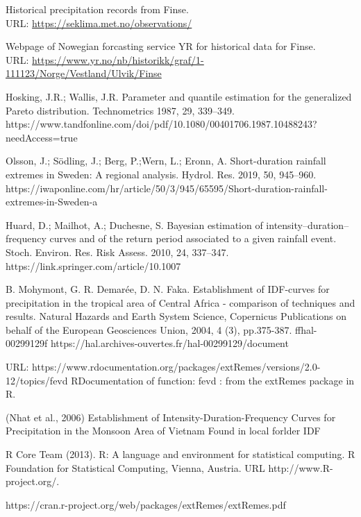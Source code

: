 \begin{thebibliography}{9}
Historical precipitation records from Finse.\\
URL: \url{https://seklima.met.no/observations/}

Webpage of Nowegian forcasting service YR for historical data for Finse.\\
URL: \url{https://www.yr.no/nb/historikk/graf/1-111123/Norge/Vestland/Ulvik/Finse}

Hosking, J.R.; Wallis, J.R. Parameter and quantile estimation for the generalized Pareto distribution.
Technometrics 1987, 29, 339–349.
https://www.tandfonline.com/doi/pdf/10.1080/00401706.1987.10488243?needAccess=true

Olsson, J.; Södling, J.; Berg, P.;Wern, L.; Eronn, A. Short-duration rainfall extremes in Sweden: A regional
analysis. Hydrol. Res. 2019, 50, 945–960.
https://iwaponline.com/hr/article/50/3/945/65595/Short-duration-rainfall-extremes-in-Sweden-a

Huard, D.; Mailhot, A.; Duchesne, S. Bayesian estimation of intensity–duration–frequency curves and of
the return period associated to a given rainfall event. Stoch. Environ. Res. Risk Assess. 2010, 24, 337–347.
https://link.springer.com/article/10.1007%

B. Mohymont, G. R. Demarée, D. N. Faka. Establishment of IDF-curves for precipitation in the
tropical area of Central Africa - comparison of techniques and results. Natural Hazards and Earth
System Science, Copernicus Publications on behalf of the European Geosciences Union, 2004, 4 (3),
pp.375-387. ffhal-00299129f
https://hal.archives-ouvertes.fr/hal-00299129/document

URL: https://www.rdocumentation.org/packages/extRemes/versions/2.0-12/topics/fevd
RDocumentation of function: fevd : from the extRemes package in R.

(Nhat et al., 2006)
Establishment of Intensity-Duration-Frequency Curves
for Precipitation in the Monsoon Area of Vietnam
Found in local forlder IDF

R Core Team (2013). R: A language and environment for statistical
computing. R Foundation for Statistical Computing, Vienna, Austria.
URL http://www.R-project.org/.

https://cran.r-project.org/web/packages/extRemes/extRemes.pdf


\end{thebibliography} 